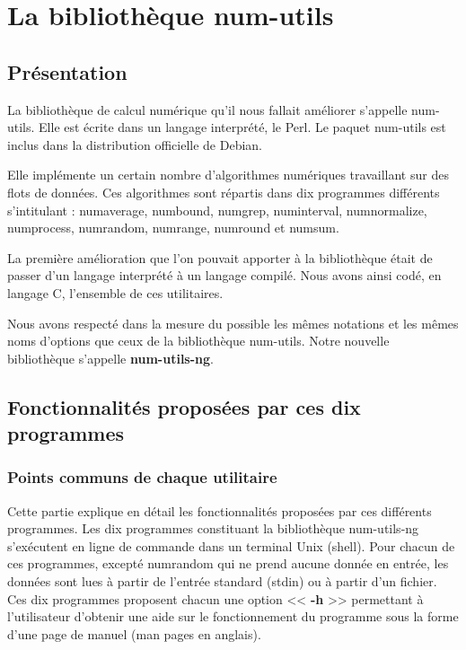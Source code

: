 \chapter{La biblioth\`eque num-utils}
\label{chap:num-utils}

\section{Pr\'esentation}
La biblioth\`eque de calcul num\'erique qu'il nous fallait am\'eliorer s'appelle num-utils. Elle est \'ecrite dans un langage
interpr\'et\'e, le Perl.
Le paquet num-utils est inclus dans la distribution officielle de Debian.

Elle impl\'emente un certain nombre d'algorithmes num\'eriques travaillant sur des flots de donn\'ees.
Ces algorithmes sont r\'epartis dans dix programmes diff\'erents s'intitulant : numaverage, numbound, numgrep, numinterval, numnormalize,
numprocess, numrandom, numrange, numround et numsum.

La premi\`ere am\'elioration que l'on pouvait apporter \`a la biblioth\`eque \'etait de passer d'un langage interpr\'et\'e \`a un langage compil\'e.
Nous avons ainsi cod\'e, en langage C, l'ensemble de ces utilitaires.

Nous avons respect\'e dans la mesure du possible les m\^emes notations et les m\^emes noms d'options que ceux de la biblioth\`eque num-utils.
Notre nouvelle biblioth\`eque s'appelle \textbf{num-utils-ng}.

\section{Fonctionnalit\'es propos\'ees par ces dix programmes}

\subsection{Points communs de chaque utilitaire}
Cette partie explique en d\'etail les fonctionnalit\'es propos\'ees par ces diff\'erents programmes.
Les dix programmes constituant la biblioth\`eque num-utils-ng s'ex\'ecutent en ligne de commande dans un terminal Unix (shell).
Pour chacun de ces programmes, except\'e numrandom qui ne prend aucune donn\'ee en entr\'ee, les donn\'ees sont lues \`a partir 
de l'entr\'ee standard (stdin) ou \`a partir d'un fichier.
Ces dix programmes proposent chacun une option << \textbf{-h} >> permettant \`a l'utilisateur d'obtenir une aide sur le fonctionnement du 
programme sous la forme d'une page de manuel (man pages en anglais).

